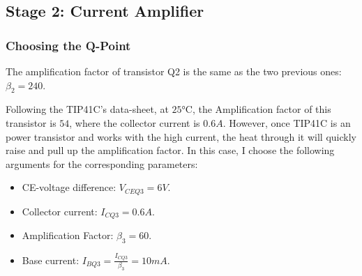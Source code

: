 \documentclass[twoside, a4paper, leqno]{article}
\begin{document}
	
	\newpage
	\subsection{Stage 2: Current Amplifier}
		\subsubsection*{Choosing the Q-Point}
		The amplification factor of transistor Q2 is the same as the two previous ones: $\beta_2 = 240$.
		
		 Following the  TIP41C's data-sheet, at $25\si{\degreeCelsius}$, the Amplification factor of this transistor is $54$, where the collector current is $0.6A$. However, once TIP41C is an power transistor and works with the high current, the heat through it will quickly raise and pull up the amplification factor. In this case, I choose the following arguments for the corresponding parameters:
		\begin{itemize}
			\item CE-voltage difference: $V_{CEQ3} = 6V$.
			\item Collector current: $I_{CQ3} = 0.6A$.
			\item Amplification Factor: $\beta_3 = 60$.
			\item Base current: $I_{BQ3} = \frac{I_{CQ3}}{\beta_3} = 10mA$.
		\end{itemize}		
	
\end{document}
